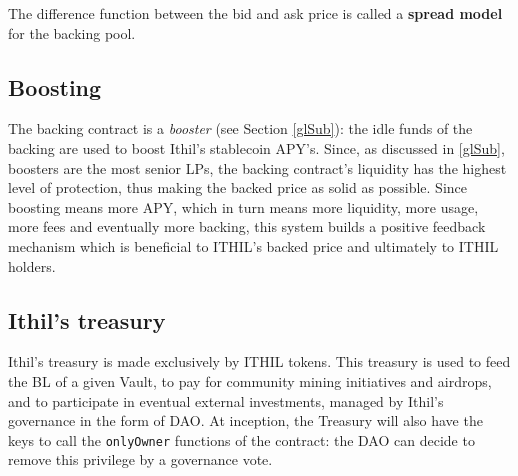 \documentclass[a4paper,10 pt]{article}
\theoremstyle{definition}
\begin{document}
The difference function between the bid and ask price is called a {\bf spread model} for the backing pool.

\subsection{Boosting}\label{boostSub}

The backing contract is a {\it booster} (see Section \ref{glSub}): the idle funds of the backing are used to boost Ithil's stablecoin APY's. Since, as discussed in \ref{glSub}, boosters are the most senior LPs, the backing contract's liquidity has the highest level of protection, thus making the backed price as solid as possible. Since boosting means more APY, which in turn means more liquidity, more usage, more fees and eventually more backing, this system builds a positive feedback mechanism which is beneficial to ITHIL's backed price and ultimately to ITHIL holders.

\subsection{Ithil's treasury}\label{ItSub}
Ithil's treasury is made exclusively by ITHIL tokens. This treasury is used to feed the BL of a given Vault, to pay for community mining initiatives and airdrops, and to participate in eventual external investments, managed by Ithil's governance in the form of DAO. At inception, the Treasury will also have the keys to call the \verb|onlyOwner| functions of the contract: the DAO can decide to remove this privilege by a governance vote.
\end{document}
